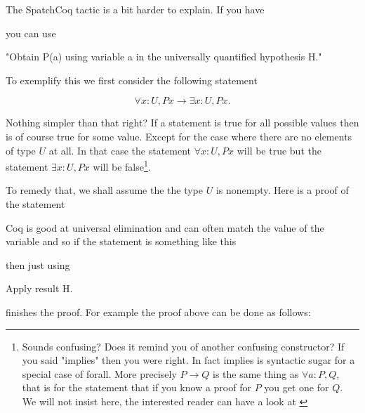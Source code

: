 The SpatchCoq tactic is a bit harder to explain. If you have

you can use 

"Obtain P(a) using variable a in the universally quantified hypothesis H."

To exemplify this we first consider the following statement

$$\forall x:U, P x \rightarrow \exists x:U, P x.$$

Nothing simpler than that right? If a statement is true for all possible values then is of course true for some value. Except for the case where there are no elements of type $U$ at all. In that case the statement $\forall x:U, P x$ will be true but the statement $\exists x:U, P x$ will be false\footnote{
 Sounds confusing? Does it remind you of another confusing constructor? If you said "implies" then you were right. In fact implies is syntactic sugar  for a special case of forall. More precisely $P\rightarrow Q$ is the same thing as $\forall a:P, Q$, that is for the statement that if you know a proof for $P$ you get one for $Q$. We will not insist here, the interested reader can have a look at \cite{coqdart}}.
 
 To remedy that, we shall assume the the type $U$ is nonempty. Here is a proof of the statement


 Coq is good at universal elimination and can often match the value of the variable  and so if the statement is something like this


then just using 

Apply result H.

 finishes the proof. For example the proof above can be done as follows:




